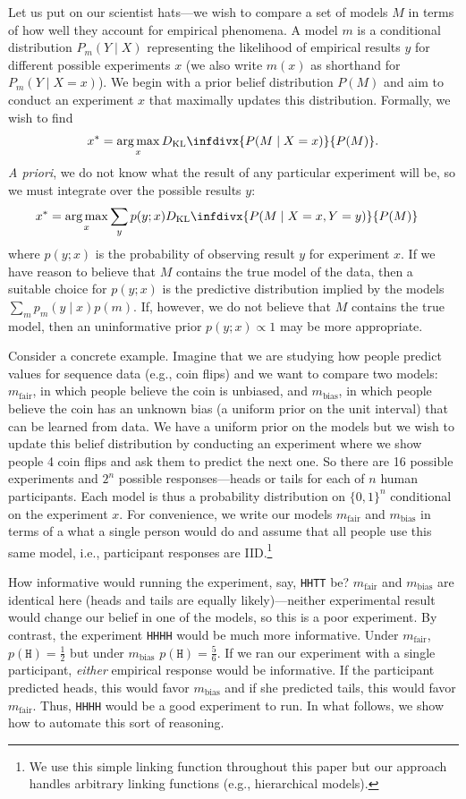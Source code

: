 \documentclass{article}
\newcommand{\dkl}{D_\mathrm{KL}\infdivx}
\DeclareMathOperator*{\argmax}{arg\,max}
\begin{document}
Let us put on our scientist hats---we wish to compare a set of models $M$ in terms of how well they account for empirical phenomena.
A model $m$ is a conditional distribution $P_m(Y \mid X)$ representing the likelihood of empirical results $y$ for different possible experiments $x$ (we also write $m(x)$ as shorthand for $P_m(Y \mid X = x)$).
We begin with a prior belief distribution $P(M)$ and aim to conduct an experiment $x$ that maximally updates this distribution.
Formally, we wish to find
$$x^{*} = \argmax_{x} \dkl{ P(M \mid X = x) }{ P(M) }.$$
\emph{A priori}, we do not know what the result of any particular experiment will be, so we must integrate over the possible results $y$:
\begin{align}
  x^{*} &= \argmax_{x} \sum\limits_{y}p(y ; x) \dkl{ P(M \mid X = x, Y = y) }{ P(M) }  \label{eq:oed}
\end{align}
where $p(y ; x)$ is the probability of observing result $y$ for experiment $x$.
If we have reason to believe that $M$ contains the true model of the data, then a suitable choice for $p(y ; x)$ is the predictive distribution implied by the models $ \sum\limits_{m}p_m(y \mid x)p(m) $.
If, however, we do not believe that $M$ contains the true model, then an uninformative prior $p(y ; x) \propto 1$ may be more appropriate.

Consider a concrete example.
Imagine that we are studying how people predict values for sequence data (e.g., coin flips) and we want to compare two models: $m_{\text{fair}}$, in which people believe the coin is unbiased, and $m_{\text{bias}}$, in which people believe the coin has an unknown bias (a uniform prior on the unit interval) that can be learned from data.
We have a uniform prior on the models but we wish to update this belief distribution by conducting an experiment where we show people 4 coin flips and ask them to predict the next one.
So there are 16 possible experiments and $2^n$ possible responses---heads or tails for each of $n$ human participants.
Each model is thus a probability distribution on $\{0,1\}^n$ conditional on the experiment $x$.
For convenience, we write our models $m_{\text{fair}}$ and $m_{\text{bias}}$ in terms of a what a single person would do and assume that all people use this same model, i.e., participant responses are IID.\footnote{We use this simple linking function throughout this paper but our approach handles arbitrary linking functions (e.g., hierarchical models).}

How informative would running the experiment, say, \lstinline{HHTT} be?
$m_{\text{fair}}$ and $m_{\text{bias}}$ are identical here (heads and tails are equally likely)---neither experimental result would change our belief in one of the models, so this is a poor experiment.
By contrast, the experiment \lstinline{HHHH} would be much more informative.
Under $m_{\text{fair}}$, $p(\texttt{H}) = \frac{1}{2}$ but under $m_{\text{bias}}$ $p(\texttt{H}) = \frac{5}{6}$.
If we ran our experiment with a single participant, \emph{either} empirical response would be informative.
If the participant predicted heads, this would favor $m_{\text{bias}}$ and if she predicted tails, this would favor $m_{\text{fair}}$.
Thus, \lstinline{HHHH} would be a good experiment to run.
In what follows, we show how to automate this sort of reasoning.
\end{document}
